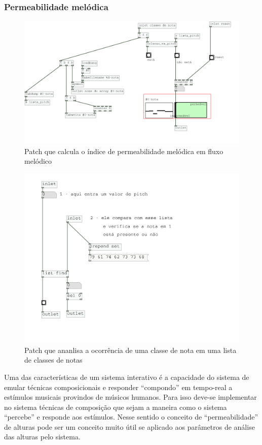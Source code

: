 \documentclass[draft]{ppgmus}
\begin{document}
\subsubsection{Permeabilidade melódica}

\begin{figure}
\includegraphics[scale=.5]{permeabilidade}
\caption{Patch que calcula o índice de permeabilidade melódica em fluxo melódico}
\label{permeabilidade}
\end{figure}

\begin{figure}
\includegraphics[scale=.5]{colecao_pitch}
\caption{Patch que ananlisa a ocorrência de uma classe de nota em uma lista de classes de notas}
\label{colecao-pitch}
\end{figure}



Uma das características de um sistema interativo é a capacidade do sistema
de emular técnicas composicionais e responder ``compondo'' em tempo-real a
estímulos musicais provindos de músicos humanos. Para isso deve-se implementar
no sistema técnicas de composição que sejam a maneira como o sistema ``percebe''
e responde aos estímulos. Nesse sentido o conceito de “permeabilidade” de 
alturas \cite{ligeti58:transformacoes} pode ser um conceito muito útil se aplicado aos parâmetros
de análise das alturas pelo sistema. 
\end{document}
